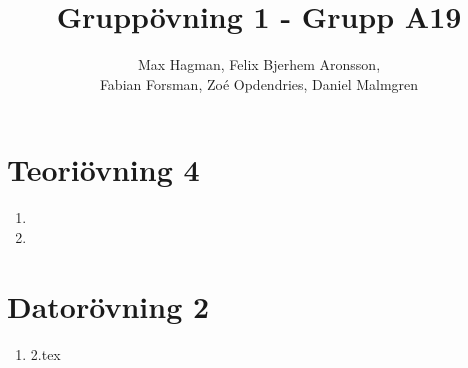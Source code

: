 \documentclass[a4paper]{report}
\title{Gruppövning 1 - Grupp A19}
\author{Max Hagman, Felix Bjerhem Aronsson,\\ Fabian Forsman, Zoé Opdendries, Daniel Malmgren}
\begin{document}
\maketitle

\section*{Teoriövning 4}
\begin{enumerate}[label=(\alph*)]
    \item {}
    \clearpage
    \item {}
\end{enumerate}
\section*{Datorövning 2}
\begin{enumerate}[label=(\alph*)]
    \item {2.tex}
\end{enumerate}
\end{document}
